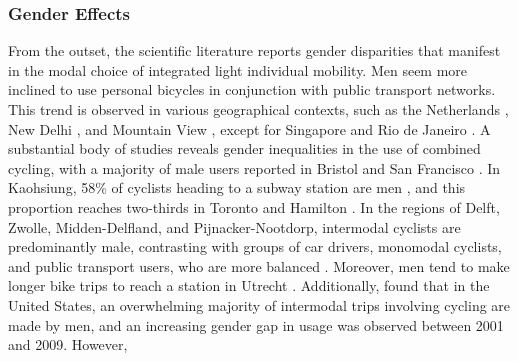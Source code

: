 \begin{refsegment}
\subsubsection*{Gender Effects
    \label{chap2:genre}
    }

From the outset, the scientific literature reports gender disparities that manifest in the modal choice of integrated light individual mobility. Men seem more inclined to use personal bicycles in conjunction with public transport networks. This trend is observed in various geographical contexts, such as the Netherlands \textcolor{blue}{\autocite[278]{debrezion_modelling_2009}}, New Delhi \textcolor{blue}{\autocite[35]{mohanty_effect_2017}}, and Mountain View \textcolor{blue}{\autocite[36]{park_finding_2014}}, except for Singapore \textcolor{blue}{\autocite[45]{meng_influence_2016}} and Rio de Janeiro \textcolor{blue}{\autocite[62]{souza_modelling_2017}}. A substantial body of studies reveals gender inequalities in the use of combined cycling, with a majority of male users reported in Bristol \textcolor{blue}{\autocite[194]{sherwin_practices_2011}} and San Francisco \textcolor{blue}{\autocite[103]{flamm_public_2014}}. In Kaohsiung, 58\% of cyclists heading to a subway station are men \textcolor{blue}{\autocite[1700]{cheng_evaluating_2012}}, and this proportion reaches two-thirds in Toronto and Hamilton \textcolor{blue}{\autocite[378]{ravensbergen_biking_2018}}. In the regions of Delft, Zwolle, Midden-Delfland, and Pijnacker-Nootdorp, intermodal cyclists are predominantly male, contrasting with groups of car drivers, monomodal cyclists, and public transport users, who are more balanced \textcolor{blue}{\autocite[114]{heinen_multimodal_2014}}. Moreover, men tend to make longer bike trips to reach a station in Utrecht \textcolor{blue}{\autocite[267]{krygsman_multimodal_2004}}. Additionally, \textcolor{blue}{\autocite[107]{wang_bicycle-transit_2013}} found that in the United States, an overwhelming majority of intermodal trips involving cycling are made by men, and an increasing gender gap in usage was observed between 2001 and 2009. However, 
\end{refsegment}
